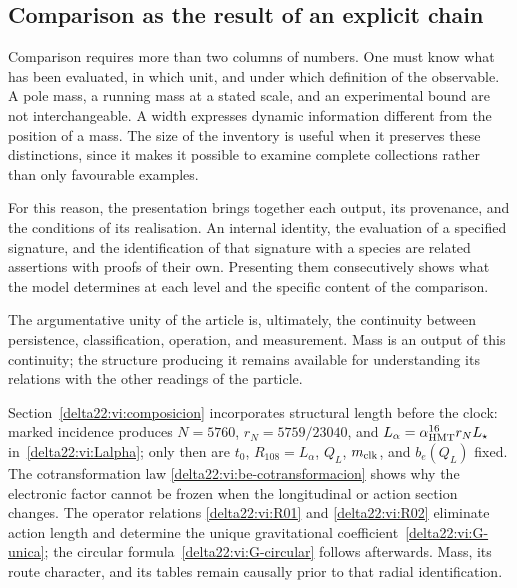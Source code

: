 \subsection{Comparison as the result of an explicit chain}

Comparison requires more than two columns of numbers. One must know what
has been evaluated, in which unit, and under which definition of the observable. A
pole mass, a running mass at a stated scale, and an
experimental bound are not interchangeable. A width expresses
dynamic information different from the position of a mass. The size of the inventory
is useful when it preserves these distinctions, since it makes it possible to examine
complete collections rather than only favourable examples.

For this reason, the presentation brings together each output, its provenance,
and the conditions of its realisation. An internal identity, the
evaluation of a specified signature, and the identification of that signature
with a species are related assertions with proofs
of their own. Presenting them consecutively shows what the
model determines at each level and the specific content of the comparison.

The argumentative unity of the article is, ultimately, the continuity between
persistence, classification, operation, and measurement. Mass is an output
of this continuity; the structure producing it remains available
for understanding its relations with the other readings of the particle.

\par
Section~\ref{delta22:vi:composicion} incorporates structural length before
the clock: marked incidence produces \(N=5760\),
\(r_N=5759/23040\), and
\(L_\alpha=\alpha_{\rm HMT}^{16}r_NL_\star\)
in~\eqref{delta22:vi:Lalpha}; only then are \(t_0\),
\(R_{108}=L_\alpha\), \(Q_L\), \(m_{\rm clk}\), and
\(b_e(Q_L)\) fixed. The cotransformation law
\eqref{delta22:vi:be-cotransformacion} shows why the electronic factor
cannot be frozen when the longitudinal or action section changes. The
operator relations \eqref{delta22:vi:R01} and
\eqref{delta22:vi:R02} eliminate action length and determine the unique
gravitational coefficient~\eqref{delta22:vi:G-unica}; the circular
formula~\eqref{delta22:vi:G-circular} follows afterwards. Mass, its route
character, and its tables remain causally prior to that radial
identification.
